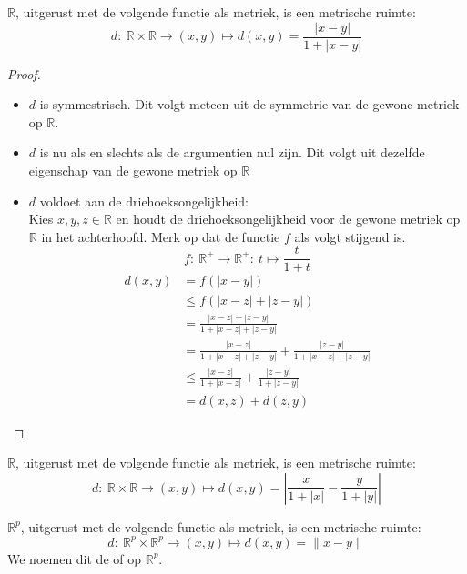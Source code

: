 \documentclass[main.tex]{subfiles}
\begin{document}
\begin{vb}
  $\mathbb{R}$, uitgerust met de volgende functie als metriek, is een metrische ruimte:
  \[ d:\ \mathbb{R}\times\mathbb{R}\rightarrow (x,y) \mapsto d(x,y)=\frac{|x-y|}{1+|x-y|} \]
  \begin{proof}
    \begin{itemize}
    \item $d$ is symmestrisch.
      Dit volgt meteen uit de symmetrie van de gewone metriek op $\mathbb{R}$.
    \item $d$ is nu als en slechts als de argumentien nul zijn.
      Dit volgt uit dezelfde eigenschap van de gewone metriek op $\mathbb{R}$
    \item $d$ voldoet aan de driehoeksongelijkheid:\\
      Kies $x,y,z \in \mathbb{R}$ en houdt de driehoeksongelijkheid voor de gewone metriek op $\mathbb{R}$ in het achterhoofd.
      Merk op dat de functie $f$ als volgt stijgend is.
      \[ f:\ \mathbb{R}^{+} \rightarrow \mathbb{R}^{+}:\ t \mapsto \frac{t}{1+t} \]
      \begin{align*}
        d(x,y)
        &= f(|x-y|)\\
        &\le f(|x-z|+|z-y|)\\
        &= \frac{|x-z|+|z-y|}{1+|x-z|+|z-y|}\\
        &= \frac{|x-z|}{1+|x-z|+|z-y|}+\frac{|z-y|}{1+|x-z|+|z-y|}\\
        &\le \frac{|x-z|}{1+|x-z|}+\frac{|z-y|}{1+|z-y|}\\
        &= d(x,z) + d(z,y)
      \end{align*}
    \end{itemize}
  \end{proof}

\end{vb}

\begin{vb}
  $\mathbb{R}$, uitgerust met de volgende functie als metriek, is een metrische ruimte:
  \[ d:\ \mathbb{R}\times\mathbb{R}\rightarrow (x,y) \mapsto d(x,y)=\left| \frac{x}{1+|x|} - \frac{y}{1+|y|} \right| \]

\end{vb}

\begin{vb}
  $\mathbb{R}^{p}$, uitgerust met de volgende functie als metriek, is een metrische ruimte:
  \[ d:\ \mathbb{R}^{p}\times\mathbb{R}^{p}\rightarrow (x,y) \mapsto d(x,y)=\|x-y\| \]
  We noemen dit de  of  op $\mathbb{R}^{p}$.
\end{vb}
\end{document}
